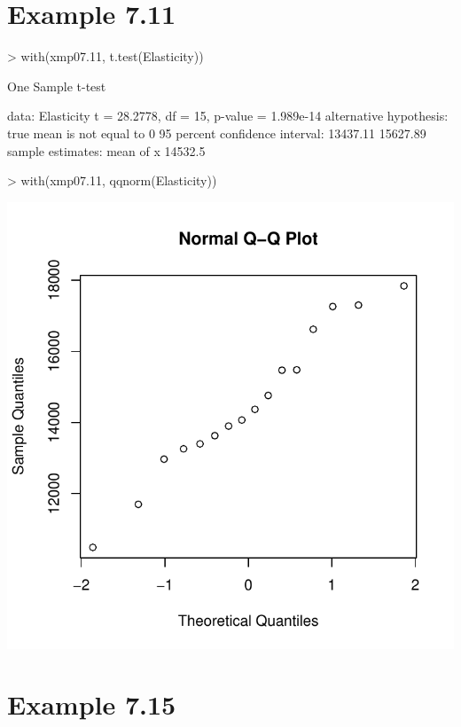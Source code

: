 \documentclass{book}
\begin{document}
\section{Example 7.11}
\label{sec:xmp0711}
\begin{center}
\begin{Schunk}
\begin{Sinput}
> with(xmp07.11, t.test(Elasticity))
\end{Sinput}
\begin{Soutput}
	One Sample t-test

data:  Elasticity 
t = 28.2778, df = 15, p-value = 1.989e-14
alternative hypothesis: true mean is not equal to 0 
95 percent confidence interval:
 13437.11 15627.89 
sample estimates:
mean of x 
  14532.5 
\end{Soutput}
\begin{Sinput}
> with(xmp07.11, qqnorm(Elasticity))
\end{Sinput}
\end{Schunk}
\includegraphics{Devore6-xmp0711a}
\end{center}

\section{Example 7.15}
\label{sec:xmp0715}
\end{document}
